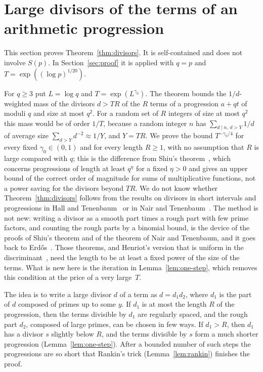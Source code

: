 \section{Large divisors of the terms of an arithmetic progression}\label{sec:divisors}

This section proves Theorem~\ref{thm:divisors}. It is self-contained and does not involve $S(p)$. In Section~\ref{sec:proof} it is applied with $q=p$ and $T=\exp((\log p)^{1/20})$.

For $q\ge3$ put $L=\log q$ and $T=\exp(L^{\gamma_0})$. The theorem bounds the $1/d$-weighted mass of the divisors $d>TR$ of the $R$ terms of a progression $a+qt$ of moduli $q$ and size at most $q^2$. For a random set of $R$ integers of size at most $q^2$ this mass would be of order $1/T$, because a random integer $n$ has $\sum_{d\mid n,\,d>Y}1/d$ of average size $\sum_{d>Y}d^{-2}\approx1/Y$, and $Y=TR$. We prove the bound $T^{-\gamma_0/4}$ for every fixed $\gamma_0\in(0,1)$ and for every length $R\ge1$, with no assumption that $R$ is large compared with $q$; this is the difference from Shiu's theorem~\cite{b24}, which concerns progressions of length at least $q^\eta$ for a fixed $\eta>0$ and gives an upper bound of the correct order of magnitude for sums of multiplicative functions, not a power saving for the divisors beyond $TR$. We do not know whether Theorem~\ref{thm:divisors} follows from the results on divisors in short intervals and progressions in Hall and Tenenbaum~\cite{b37} or in Nair and Tenenbaum~\cite{b38}. The method is not new: writing a divisor as a smooth part times a rough part with few prime factors, and counting the rough parts by a binomial bound, is the device of the proofs of Shiu's theorem and of the theorem of Nair and Tenenbaum, and it goes back to Erd\H{o}s~\cite{b10}. Those theorems, and Henriot's version that is uniform in the discriminant~\cite{b15}, need the length to be at least a fixed power of the size of the terms. What is new here is the iteration in Lemma~\ref{lem:one-step}, which removes this condition at the price of a very large~$T$.

The idea is to write a large divisor $d$ of a term as $d=d_1d_2$, where $d_1$ is the part of $d$ composed of primes up to some $y$. If $d_1$ is at most the length $R$ of the progression, then the terms divisible by $d_1$ are regularly spaced, and the rough part $d_2$, composed of large primes, can be chosen in few ways. If $d_1>R$, then $d_1$ has a divisor $s$ slightly below $R$, and the terms divisible by $s$ form a much shorter progression (Lemma~\ref{lem:one-step}). After a bounded number of such steps the progressions are so short that Rankin's trick (Lemma~\ref{lem:rankin}) finishes the proof.

